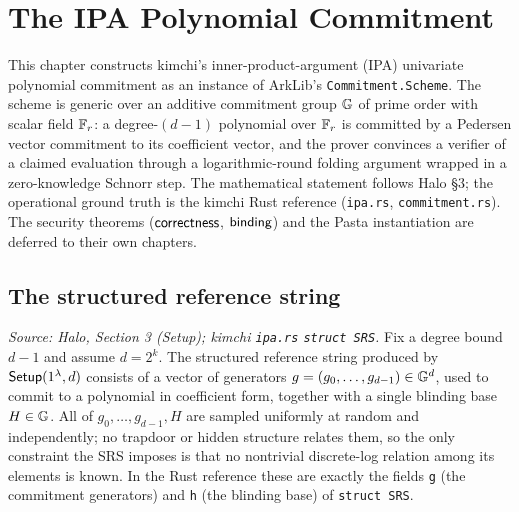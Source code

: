 \chapter{The IPA Polynomial Commitment}

This chapter constructs kimchi's inner-product-argument (IPA) univariate
polynomial commitment as an instance of ArkLib's \texttt{Commitment.Scheme}. The
scheme is generic over an additive commitment group \(\mathbb{G}\) of prime order with
scalar field \(\mathbb{F}_r\): a degree-\((d-1)\) polynomial over \(\mathbb{F}_r\) is committed by a
Pedersen vector commitment to its coefficient vector, and the prover convinces a
verifier of a claimed evaluation through a logarithmic-round folding argument
wrapped in a zero-knowledge Schnorr step. The mathematical statement follows
Halo \S3; the operational ground truth is the kimchi Rust reference
(\texttt{ipa.rs}, \texttt{commitment.rs}). The security theorems
(\(\mathsf{correctness}\), \(\mathsf{binding}\)) and the Pasta instantiation are deferred to
their own chapters.

\section{The structured reference string}

\begin{definition}
  \label{def:ipa_srs}
  \textit{Source: Halo, Section 3 (Setup); kimchi \texttt{ipa.rs} \texttt{struct SRS}.}
  Fix a degree bound \(d - 1\) and assume \(d = 2^{k}\). The structured reference
  string produced by \(\mathsf{Setup}(1^{\lambda}, d)\) consists of a vector of generators
  \(g = (g_{0}, \dots, g_{d-1}) \in \mathbb{G}^{d}\), used to commit to a polynomial in
  coefficient form, together with a single blinding base \(H \in \mathbb{G}\). All of
  \(g_{0}, \dots, g_{d-1}, H\) are sampled uniformly at random and independently;
  no trapdoor or hidden structure relates them, so the only constraint the SRS
  imposes is that no nontrivial discrete-log relation among its elements is known.
  In the Rust reference these are exactly the fields \texttt{g} (the commitment
  generators) and \texttt{h} (the blinding base) of \texttt{struct SRS}.
\end{definition}

